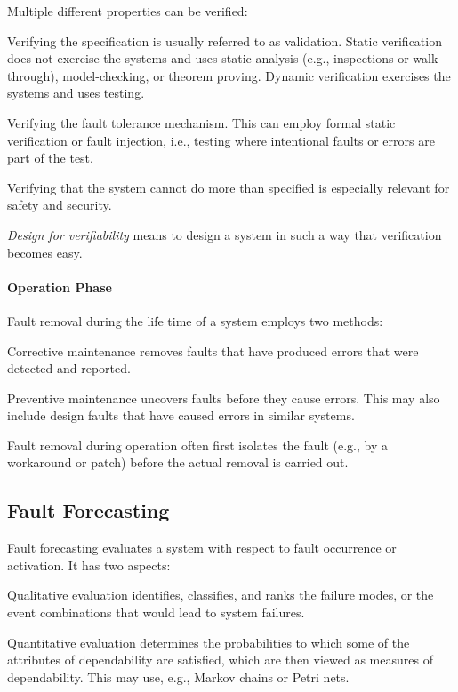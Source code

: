 Multiple different properties can be verified:
\begin{compactitem}
 \item Verifying the specification is usually referred to as validation.
Static verification does not exercise the systems and uses static analysis (e.g., inspections or walk-through), model-checking, or theorem proving.
Dynamic verification exercises the systems and uses testing.
\item Verifying the fault tolerance mechanism.
This can employ formal static verification or fault injection, i.e., testing where intentional faults or errors are part of the test.
\item Verifying that the system cannot do more than specified is especially relevant for safety and security.
\end{compactitem}

\emph{Design for verifiability} means to design a system in such a way that verification becomes easy.

\paragraph{Operation Phase}
Fault removal during the life time of a system employs two methods:
\begin{compactitem}
\item Corrective maintenance removes faults that have produced errors that were detected and reported.
\item Preventive maintenance uncovers faults before they cause errors.
This may also include design faults that have caused errors in similar systems.
\end{compactitem}

Fault removal during operation often first isolates the fault (e.g., by a workaround or patch) before the actual removal is carried out.

\subsection{Fault Forecasting}

Fault forecasting evaluates a system with respect to fault occurrence or activation.
It has two aspects:
\begin{compactitem}
  \item Qualitative evaluation identifies, classifies, and ranks the failure modes, or the event combinations that would lead to system failures.
  \item Quantitative evaluation determines the probabilities to which some of the attributes of dependability are satisfied, which are then viewed as measures of dependability.
  This may use, e.g., Markov chains or Petri nets.
\end{compactitem}

